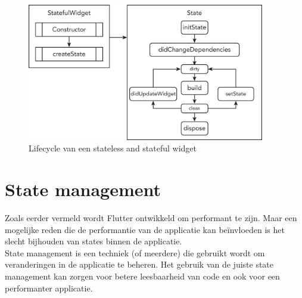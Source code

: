 \begin{figure}[h]
    \centering
    \includegraphics[height=6cm, keepaspectratio]{graphics/widgetLifecycle.png}
    \caption{Lifecycle van een stateless and stateful widget \autocite{Goel2023}}
\end{figure}












\section{{State management}}%
\label{sec:State management}
Zoals eerder vermeld wordt Flutter ontwikkeld om performant te zijn. Maar een mogelijke reden die de performantie van de applicatie kan beïnvloeden is het slecht 
bijhouden van states binnen de applicatie.
\\
State management is een techniek (of meerdere) die gebruikt wordt om veranderingen in de applicatie te beheren. Het gebruik van de juiste state management kan zorgen 
voor betere leesbaarheid van code en ook voor een performanter applicatie. 



